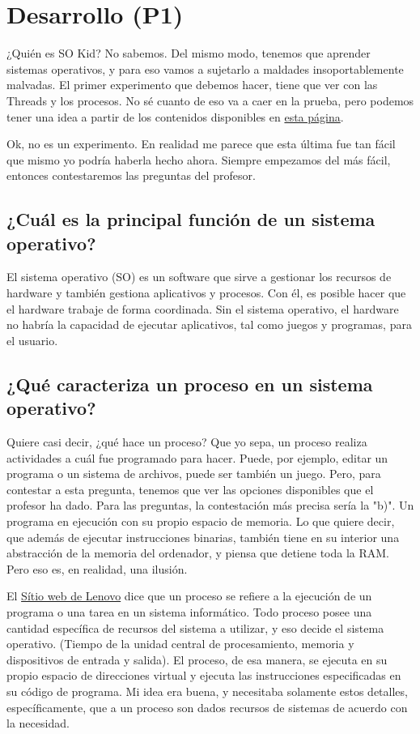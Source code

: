 \section{Desarrollo (P1)}

¿Quién es SO Kid? No sabemos. Del mismo modo, tenemos que aprender sistemas operativos,
y para eso vamos a sujetarlo a maldades insoportablemente malvadas. El primer experimento que debemos hacer,
tiene que ver con las Threads y los procesos. No sé cuanto de eso va a caer en la prueba, pero podemos tener una idea
a partir de los contenidos disponibles en \href{https://github.com/rafinhadufluxo/Materias-UFFS/blob/master/Sistemas%20Operacionais/2025.2%20PROVA%20P1.pdf}{esta página}.

Ok, no es un experimento. En realidad me parece que esta última fue tan fácil que mismo yo podría haberla hecho ahora.
Siempre empezamos del más fácil, entonces contestaremos las preguntas del profesor.

\subsection{¿Cuál es la principal función de un sistema operativo?}

El sistema operativo (SO) es un software que sirve a gestionar los recursos de hardware
y también gestiona aplicativos y procesos. Con él, es posible hacer que el hardware
trabaje de forma coordinada. Sin el sistema operativo, el hardware no habría la capacidad de ejecutar
aplicativos, tal como juegos y programas, para el usuario.

\subsection{¿Qué caracteriza un proceso en un sistema operativo?}
Quiere casi decir, ¿qué hace un proceso? Que yo sepa, un proceso realiza actividades a cuál
fue programado para hacer. Puede, por ejemplo, editar un programa o un sistema de archivos,
puede ser también un juego. Pero, para contestar a esta pregunta, tenemos que ver las opciones disponibles
que el profesor ha dado. Para las preguntas, la contestación más precisa sería la "b)".
Un programa en ejecución con su propio espacio de memoria. Lo que quiere decir, que además
de ejecutar instrucciones binarias, también tiene en su interior una abstracción de la memoria del ordenador,
y piensa que detiene toda la RAM. Pero eso es, en realidad, una ilusión.

El \href{https://www.lenovo.com/es/es/glossary/process/}{Sítio web de Lenovo} dice que un proceso se refiere
a la ejecución de un programa o una tarea en un sistema informático. Todo proceso posee una cantidad
específica de recursos del sistema a utilizar, y eso decide el sistema operativo. (Tiempo de la unidad central de procesamiento, memoria y dispositivos de entrada y salida).
El proceso, de esa manera, se ejecuta en su propio espacio de direcciones virtual y ejecuta las instrucciones especificadas en su código de programa.
Mi idea era buena, y necesitaba solamente estos detalles, específicamente, que a un proceso son dados recursos de sistemas de acuerdo con la necesidad.

